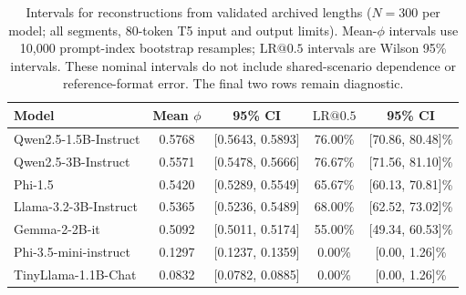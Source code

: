 \begin{table}[ht]
\centering
\caption{EOS subsets of the archived-reference cohort ($N=300$ per model; validated length inputs, all segments, 80-token T5 input and output limits). EOS-only metrics select \texttt{response\_complete} samples; they do not certify correct reconstructions. Both LR columns report percentages. Phi-3.5-mini and TinyLlama remain reference-format diagnostics.}
\label{tab:eos_completeness}
\end{table}

\begin{table}[ht]
\centering
\caption{Intervals for reconstructions from validated archived lengths ($N=300$ per model; all segments, 80-token T5 input and output limits). Mean-$\phi$ intervals use 10,000 prompt-index bootstrap resamples; $\mathrm{LR}@0.5$ intervals are Wilson 95\% intervals. These nominal intervals do not include shared-scenario dependence or reference-format error. The final two rows remain diagnostic.}
\label{tab:statistical_results}
\begin{tabular}{l c c c c}
\toprule
Model & Mean $\phi$ & 95\% CI & $\mathrm{LR}@0.5$ & 95\% CI \\
\midrule
Qwen2.5-1.5B-Instruct & 0.5768 & [0.5643, 0.5893] & 76.00\% & [70.86, 80.48]\% \\
Qwen2.5-3B-Instruct & 0.5571 & [0.5478, 0.5666] & 76.67\% & [71.56, 81.10]\% \\
Phi-1.5 & 0.5420 & [0.5289, 0.5549] & 65.67\% & [60.13, 70.81]\% \\
Llama-3.2-3B-Instruct & 0.5365 & [0.5236, 0.5489] & 68.00\% & [62.52, 73.02]\% \\
Gemma-2-2B-it & 0.5092 & [0.5011, 0.5174] & 55.00\% & [49.34, 60.53]\% \\
Phi-3.5-mini-instruct & 0.1297 & [0.1237, 0.1359] & 0.00\% & [0.00, 1.26]\% \\
TinyLlama-1.1B-Chat & 0.0832 & [0.0782, 0.0885] & 0.00\% & [0.00, 1.26]\% \\
\bottomrule
\end{tabular}
\end{table}

